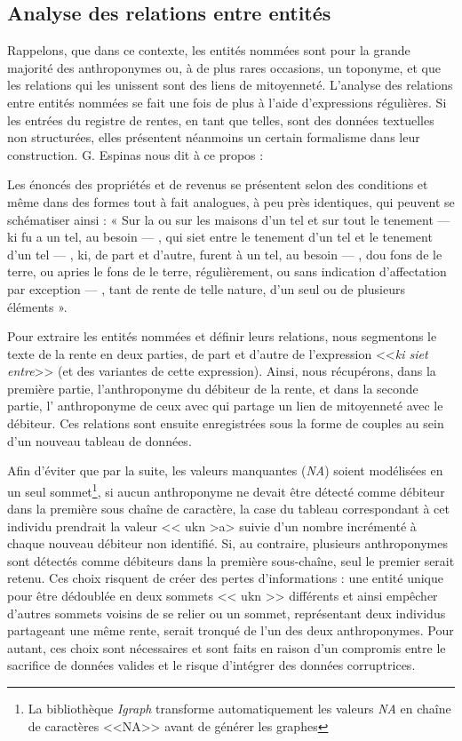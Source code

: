 \subsection{Analyse des relations entre entités}
Rappelons, que dans ce contexte, les entités nommées sont pour la grande majorité des anthroponymes ou, à de plus rares occasions, un toponyme, et que les relations qui les unissent sont des liens de mitoyenneté.
L'analyse des relations entre entités nommées se fait une fois de plus à l'aide d'expressions régulières. Si les entrées du registre de rentes, en tant que telles, sont des données textuelles non structurées, elles présentent néanmoins un certain formalisme dans leur construction. G. Espinas nous dit à ce propos : 
\begin{displayquote}
    \og Les énoncés des propriétés et de revenus se présentent selon des conditions et même dans des formes tout à fait analogues, à peu près identiques, qui peuvent se schématiser ainsi : « Sur la ou sur les maisons d’un tel et sur tout le tenement — ki fu a un tel, au besoin — , qui siet entre le tenement d’un tel et le tenement d’un tel — , ki, de part et d’autre, furent à un tel, au besoin — , dou fons de le terre, ou apries le fons de le terre, régulièrement, ou sans indication d’affectation par exception — , tant de rente de telle nature, d’un seul ou de plusieurs éléments ».\fg{}
\end{displayquote} 
\vspace{0,5cm}
Pour extraire les entités nommées et définir leurs relations, nous segmentons le texte de la rente en deux parties, de part et d'autre de l'expression <<\textit{ki siet entre}>> (et des variantes de cette expression). Ainsi, nous récupérons, dans la première partie, l'anthroponyme du débiteur de la rente, et dans la seconde partie, l' anthroponyme de ceux avec qui partage un lien de mitoyenneté avec le débiteur. Ces relations sont ensuite enregistrées sous la forme de couples au sein d'un nouveau tableau de données.

Afin d'éviter que par la suite, les valeurs manquantes (\textit{NA}) soient modélisées en un seul sommet\footnote{La bibliothèque \textit{Igraph} transforme automatiquement les valeurs \textit{NA} en chaîne de caractères <<NA>> avant de générer les graphes}, si aucun anthroponyme ne devait être détecté comme débiteur dans la première sous chaîne de caractère, la case du tableau correspondant à cet individu prendrait la valeur << ukn >a> suivie d'un nombre incrémenté à chaque nouveau débiteur non identifié. Si, au contraire, plusieurs anthroponymes sont détectés comme débiteurs  dans la première sous-chaîne, seul le premier serait retenu. Ces choix  risquent de créer des pertes d'informations :  une entité unique pour être dédoublée en deux sommets << ukn >> différents et ainsi empêcher d'autres sommets voisins de se relier ou  un sommet, représentant deux individus partageant une même rente, serait tronqué de l'un des deux anthroponymes. Pour autant, ces choix  sont nécessaires et sont faits en raison d'un compromis entre le sacrifice de données valides et le risque d'intégrer des données corruptrices.
